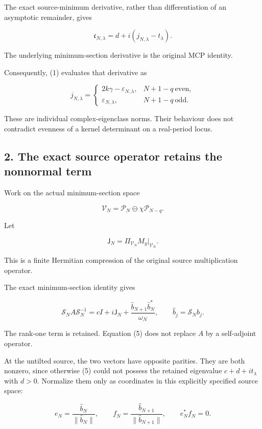 The exact source-minimum derivative, rather than differentiation of an asymptotic remainder, gives

\[
\boxed{
\mathfrak c_{N,\lambda}
=
d+i(j_{N,\lambda}-t_\lambda).
}
\tag{3}
\]

The underlying minimum-section derivative is the original MCP identity.

Consequently, (1) evaluates that derivative as

\[
\boxed{
j_{N,\lambda}
=
\begin{cases}
2k\gamma-\varepsilon_{N,\lambda},
&N+1-q\ \text{even},\\[2mm]
\varepsilon_{N,\lambda},
&N+1-q\ \text{odd}.
\end{cases}
}
\tag{4}
\]

These are individual complex-eigenclass norms. Their behaviour does not contradict evenness of a kernel determinant on a real-period locus.

\subsection{2. The exact source operator retains the nonnormal term}\label{the-exact-source-operator-retains-the-nonnormal-term}

Work on the actual minimum-section space

\[
\mathcal V_N
=
\mathcal P_N\ominus\chi\mathcal P_{N-q}.
\]

Let

\[
\mathsf J_N=\Pi_{\mathcal V_N}M_y|_{\mathcal V_N}.
\]

This is a finite Hermitian compression of the original source multiplication operator.

The exact minimum-section identity gives

\[
\mathscr S_NA\mathscr S_N^{-1}
=
cI+i\mathsf J_N
+
\frac{\widehat b_{N+1}\widehat b_N^*}{\omega_N},
\qquad
\widehat b_j=\mathscr S_Nb_j.
\tag{5}
\]

The rank-one term is retained. Equation (5) does not replace \(A\) by a self-adjoint operator.

At the untilted source, the two vectors have opposite parities. They are both nonzero, since otherwise (5) could not possess the retained eigenvalue \(c+d+it_\lambda\) with \(d>0\). Normalize them only as coordinates in this explicitly specified source space:

\[
e_N=\frac{\widehat b_N}{\|\widehat b_N\|},
\qquad
f_N=\frac{\widehat b_{N+1}}{\|\widehat b_{N+1}\|},
\qquad e_N^*f_N=0.
\]

